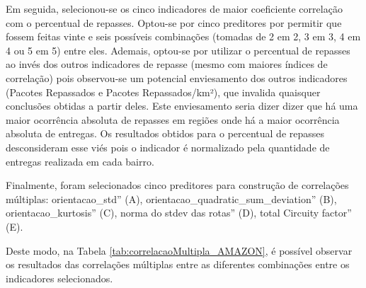 Em seguida, %
%
%
selecionou-se os cinco indicadores de maior coeficiente correlação com o percentual de repasses.
Optou-se por cinco preditores por permitir que fossem feitas vinte e seis possíveis combinações (tomadas de 2 em 2, 3 em 3, 4 em 4 ou 5 em 5) entre eles.
Ademais, optou-se por utilizar o percentual de repasses ao invés dos outros indicadores de repasse (mesmo com maiores índices de correlação) pois observou-se um potencial enviesamento dos outros indicadores (Pacotes Repassados e Pacotes Repassados/km²), que invalida quaisquer conclusões obtidas a partir deles.
Este enviesamento seria dizer dizer que há uma maior ocorrência absoluta de repasses em regiões onde há a maior ocorrência absoluta de entregas.
Os resultados obtidos para o percentual de repasses desconsideram esse viés pois o indicador é normalizado pela quantidade de entregas realizada em cada bairro.

Finalmente, foram selecionados cinco preditores para construção de correlações múltiplas: 
orientacao\_std'' (A), 
orientacao\_quadratic\_sum\_deviation'' (B),
orientacao\_kurtosis'' (C),
norma do stdev das rotas'' (D),
total Circuity factor'' (E).

Deste modo, na Tabela \ref{tab:correlacaoMultipla_AMAZON}, é possível observar os resultados das correlações múltiplas entre as diferentes combinações entre os indicadores selecionados.


